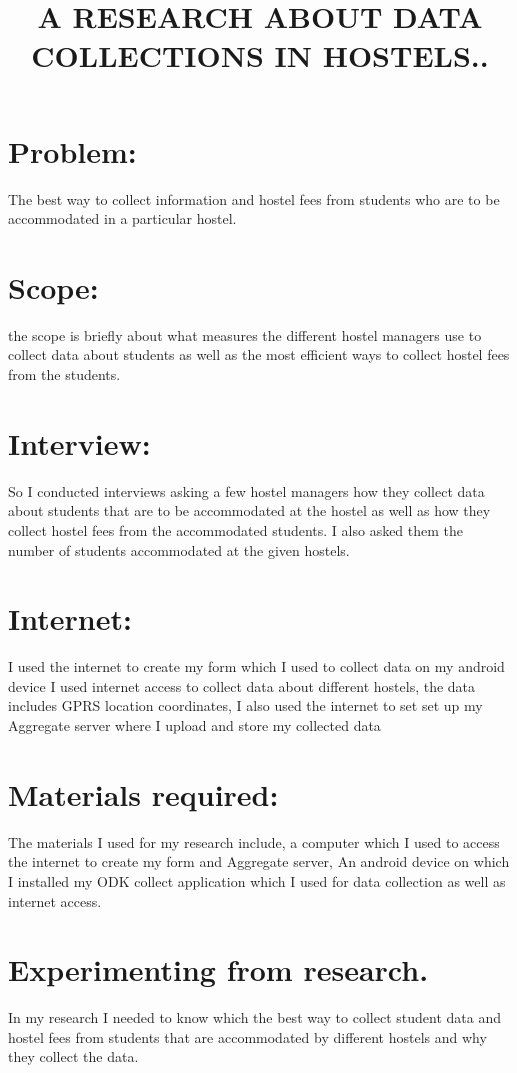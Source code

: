 \documentclass[24pt,a4paper]{article}
\begin{document}
\title{A RESEARCH ABOUT DATA COLLECTIONS IN HOSTELS.. }
\maketitle

\section{Problem: }
The best way to  collect information and hostel fees from students  who are to be accommodated in a particular hostel.

\section{Scope: }
the scope is briefly about what measures  the different hostel managers use to collect data about students as well as the most efficient ways to collect hostel fees from the students.
\section{Interview:}
So I conducted  interviews asking a few hostel managers how they collect data about students that are to be accommodated at the hostel as well as how they collect hostel fees from the accommodated students.
I also asked them the  number of students accommodated at the given hostels.

\section{Internet:}
I used the internet to create my form which I used to collect data on my android device
I  used internet access to collect data about different hostels, the data includes GPRS location coordinates,
 I also used the internet to set set up my Aggregate server where I upload and store my collected data 
 


\section{Materials required:}
The materials   I used  for my research include, a computer which I used to access the internet to create my form and Aggregate server, An android device on which I installed my ODK collect application which I used for data collection as well as internet access.

\section{Experimenting from research.}
In my research I needed to know which the best way to collect student data and  hostel fees from students  that are accommodated by different hostels and why they collect the data.
\end{document}

